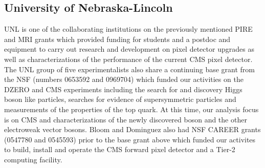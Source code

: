 \subsection{University of Nebraska-Lincoln} 

UNL is one of the collaborating institutions on the previously
mentioned PIRE and MRI grants which provided funding for students and
a postdoc and equipment to carry out research and development on pixel
detector upgrades as well as characterizations of the performance of
the current CMS pixel detector.  The UNL group of five
experimentalists also share a continuing base grant from the NSF
(numbers 0653592 and 0969704) which funded our activities on the DZERO
and CMS experiments including the search for and discovery Higgs boson
like particles, searches for evidence of supersymmetric particles and
measurements of the properties of the top quark.  At this time, our
analysis focus is on CMS and characterizations of the newly discovered
boson and the other electroweak vector bosons.  Bloom and Dominguez
also had NSF CAREER grants (0547780 and 0545593) prior to the base
grant above which funded our activites to build, install and operate
the CMS forward pixel detector and a Tier-2 computing facility.
